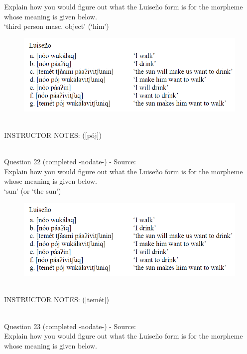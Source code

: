 \documentclass[12pt]{article}
\begin{document}
Explain how you would figure out what the Luiseño form is for the morpheme whose meaning is given below.\\

‘third person masc. object’ (‘him’)

\begin{figure}[H]
\includegraphics{../images/luiseno.png}
\end{figure}

~\\
INSTRUCTOR NOTES: ([pój])


~\\

{\large Question 22} (completed -nodate-) - Source: \\

Explain how you would figure out what the Luiseño form is for the morpheme whose meaning is given below.\\

‘sun’ (or ‘the sun’)

\begin{figure}[H]
\includegraphics{../images/luiseno.png}
\end{figure}

~\\
INSTRUCTOR NOTES: ([temét])


~\\

{\large Question 23} (completed -nodate-) - Source: \\

Explain how you would figure out what the Luiseño form is for the morpheme whose meaning is given below.\\
\end{document}
